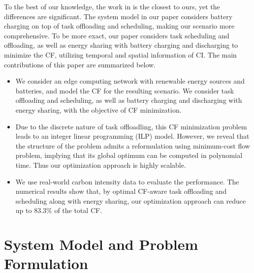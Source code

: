 \documentclass[conference, 10pt, ﬁnal, letterpaper, twocolumn]{IEEEtran}
\begin{document}
To the best of our knowledge, the work in \cite{yang2022carbon} is the closest to ours, yet the differences are significant. The system model in our paper considers battery charging on top of task offloading and scheduling, making our scenario more comprehensive. To be more exact, our paper considers task scheduling and offloading, as well as energy sharing with battery charging and discharging to minimize the CF, utilizing temporal and spatial information of CI. The main contributions of this paper are summarized below.
\begin{itemize}
    \item We consider an edge computing network with renewable energy sources and batteries, and model the CF for the resulting scenario. We consider task offloading and scheduling, as well as battery charging and discharging with energy sharing, with the objective of CF minimization. 
    \item Due to the discrete nature of task offloadling, this CF minimization problem leads to an integer linear programming (ILP) model. However, we reveal that the structure of the problem admits a reformulation using minimum-cost flow problem, implying that its global optimum can be computed in polynomial time. Thus our optimization approach is highly scalable. 
    \item We use real-world carbon intensity data to evaluate the performance. The numerical results show that, by optimal CF-aware task offloading and scheduling along with energy sharing, our optimization approach can reduce up to $83.3\%$ of the total CF.
\end{itemize}

\section{System Model and Problem Formulation}


\end{document}
